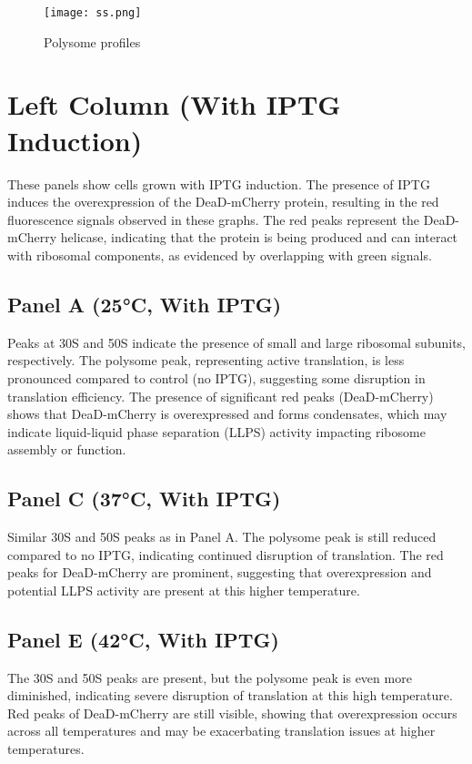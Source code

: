 \documentclass[12pt]{article}
\begin{document}
\begin{figure}[h] 
\centering 
\texttt{[image: ss.png]}\\
\caption{Polysome profiles}
\end{figure} 




\section{Left Column (With IPTG Induction)}

These panels show cells grown with IPTG induction.
The presence of IPTG induces the overexpression of the DeaD-mCherry protein, resulting in the red fluorescence signals observed in these graphs. The red peaks represent the DeaD-mCherry helicase, indicating that the protein is being produced and can interact with ribosomal components, as evidenced by overlapping with green signals.

\subsection{Panel A (25°C, With IPTG)}

Peaks at 30S and 50S indicate the presence of small and large ribosomal subunits, respectively. The polysome peak, representing active translation, is less pronounced compared to control (no IPTG), suggesting some disruption in translation efficiency. The presence of significant red peaks (DeaD-mCherry) shows that DeaD-mCherry is overexpressed and forms condensates, which may indicate liquid-liquid phase separation (LLPS) activity impacting ribosome assembly or function.

\subsection{Panel C (37°C, With IPTG)}


Similar 30S and 50S peaks as in Panel A. The polysome peak is still reduced compared to no IPTG, indicating continued disruption of translation. The red peaks for DeaD-mCherry are prominent, suggesting that overexpression and potential LLPS activity are present at this higher temperature.

\subsection{Panel E (42°C, With IPTG)}

    
The 30S and 50S peaks are present, but the polysome peak is even more diminished, indicating severe disruption of translation at this high temperature. Red peaks of DeaD-mCherry are still visible, showing that overexpression occurs across all temperatures and may be exacerbating translation issues at higher temperatures.
\end{document}
